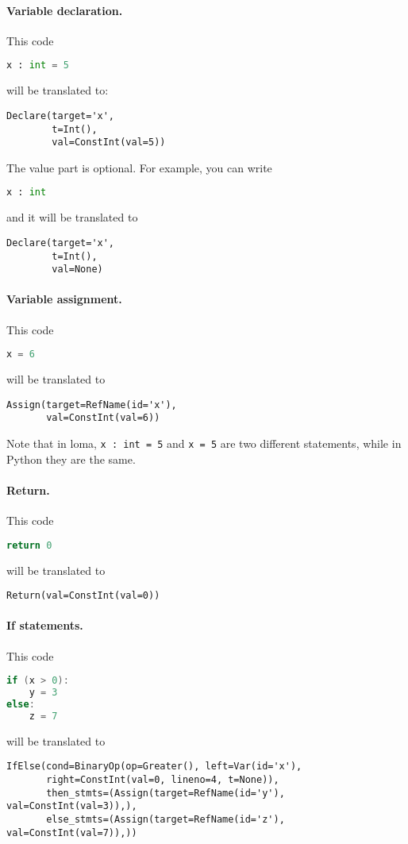 \paragraph{Variable declaration.} This code
\begin{lstlisting}[language=Python]
x : int = 5
\end{lstlisting}
will be translated to:
\begin{lstlisting}
Declare(target='x',
        t=Int(),
        val=ConstInt(val=5))
\end{lstlisting}

The value part is optional. For example, you can write
\begin{lstlisting}[language=Python]
x : int
\end{lstlisting}
and it will be translated to
\begin{lstlisting}
Declare(target='x',
        t=Int(),
        val=None)
\end{lstlisting}

\paragraph{Variable assignment.} This code
\begin{lstlisting}[language=Python]
x = 6
\end{lstlisting}
will be translated to
\begin{lstlisting}
Assign(target=RefName(id='x'),
       val=ConstInt(val=6))
\end{lstlisting}

Note that in loma, \lstinline{x : int = 5} and \lstinline{x = 5} are two different statements, while in Python they are the same.

\paragraph{Return.} This code
\begin{lstlisting}[language=Python]
return 0
\end{lstlisting}
will be translated to
\begin{lstlisting}
Return(val=ConstInt(val=0))
\end{lstlisting}

\paragraph{If statements.} This code
\begin{lstlisting}[language=c]
if (x > 0):
    y = 3
else:
    z = 7
\end{lstlisting}
will be translated to
\begin{lstlisting}
IfElse(cond=BinaryOp(op=Greater(), left=Var(id='x'),
       right=ConstInt(val=0, lineno=4, t=None)),
       then_stmts=(Assign(target=RefName(id='y'), val=ConstInt(val=3)),),
       else_stmts=(Assign(target=RefName(id='z'), val=ConstInt(val=7)),))
\end{lstlisting}

